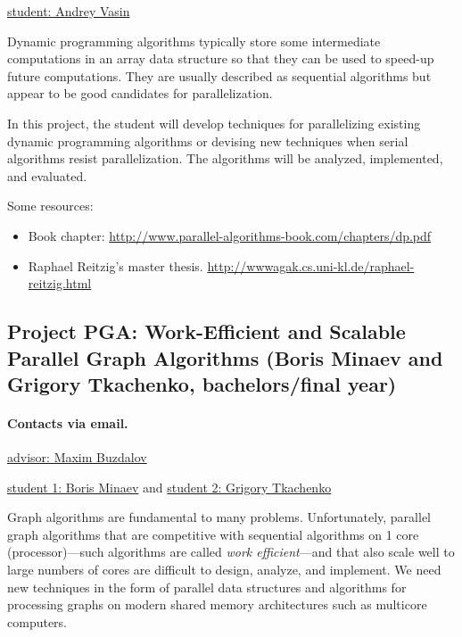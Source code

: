 \documentclass[11pt]{article}
\newcommand{\email}[2]{\href{mailto:#2}{#1}}
\begin{document}
\email
{student: Andrey Vasin}
{vasinandrey2010@gmail.com}

Dynamic programming algorithms typically store some intermediate
computations in an array data structure so that they can be used to
speed-up future computations.  They are usually described as
sequential algorithms but appear to be good candidates for
parallelization.  

In this project, the student will develop techniques for parallelizing
existing dynamic programming algorithms or devising new techniques
when serial algorithms resist parallelization.  The algorithms will be
analyzed, implemented, and evaluated.


Some resources:

\begin{itemize}
\item Book chapter:
\url{http://www.parallel-algorithms-book.com/chapters/dp.pdf}

\item
Raphael Reitzig's master thesis.
\url{http://wwwagak.cs.uni-kl.de/raphael-reitzig.html}
\end{itemize}



\subsection{Project PGA: Work-Efficient and Scalable Parallel Graph
  Algorithms (Boris Minaev and Grigory Tkachenko, bachelors/final year)}


\paragraph{Contacts via email.}

\email{advisor: Maxim Buzdalov}{mbuzdalov@gmail.com}

\email
{student 1: Boris Minaev} 
{mb.787788@gmail.com}
and
\email
{student 2: Grigory Tkachenko}
{grtkachenko@gmail.com}

Graph algorithms are fundamental to many problems.  Unfortunately,
parallel graph algorithms that are competitive with sequential
algorithms on 1 core (processor)---such algorithms are called {\em
  work efficient}---and that also scale well to large numbers of cores
are difficult to design, analyze, and implement.  We need new
techniques in the form of parallel data structures and algorithms for
processing graphs on modern shared memory architectures such as
multicore computers.
\end{document}
